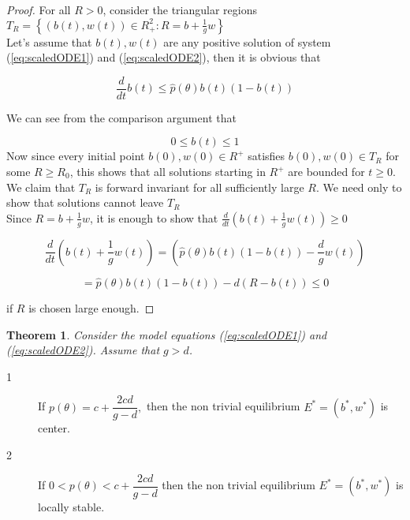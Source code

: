 \documentclass[review,authoryear]{elsarticle}
\newtheorem{theorem}{Theorem}[section]
\begin{document}
\begin{proof}
For all $R>0$, consider the triangular regions $T_{R}=\left\{ \left(b(t),w(t)\right) \in R_{+}^{2}:R=b+\frac{1}{g}w\right\} $\\
Let's assume that $b(t),w(t)$ are any positive solution of system (\ref{eq:scaledODE1}) and (\ref{eq:scaledODE2}),
then it is obvious that

$$\frac{d}{dt}b(t)\leq \hat{p}\left( \theta \right) b(t)\left( 1-b(t)\right) $$

We can see from the comparison argument that

$$0\leq b(t)\leq 1$$
Now since every initial point $b(0),w(0)\in R^{+}$ satisfies $b(0),w(0)\in T_{R}$ for some $R\geq R_{0}$, this shows that all solutions starting in $R^{+}$ are bounded for $t\geq 0$.\\
We claim that $T_{R}$ is forward invariant for all sufficiently large $R.$ We
need only to show that solutions cannot leave $T_{R}$\\
Since $R=b+\frac{1}{g}w $, 
it is enough to show that $\frac{d}{dt}\left( b(t)+\frac{1}{g}w(t)\right)\geq 0$

$$\frac{d}{dt}\left( b(t)+\frac{1}{g}w(t)\right)
=\left( \hat{p}\left( \theta \right) b(t)\left( 1-b(t)\right) -\frac{d}{g}%
w\left( t\right) \right) $$

$$ =\hat{p}\left( \theta \right) b(t)\left(
1-b(t)\right) -d\left( R-b(t)\right) \leq 0$$

if $R$ is chosen large enough.
\end{proof}

\begin{theorem}
   Consider the model equations (\ref{eq:scaledODE1}) and
  (\ref{eq:scaledODE2}). Assume that  $g>d$.
 
\end{theorem}

\begin{description}
\item[1]  If $%
p(\theta )=c+\dfrac{2cd}{g-d},$ then the non trivial equilibrium $%
E^{\ast }=(b^{\ast },w^{\ast })$ is center.

\item[2] If $0<p(\theta )<c+\dfrac{2cd}{g-d}$ then the non trivial
equilibrium $E^{\ast }=(b^{\ast },w^{\ast })$ is locally stable.
\end{description}
\end{document}

